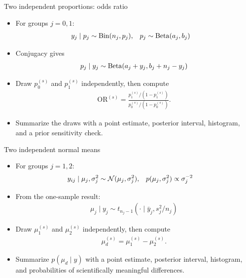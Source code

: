 \documentclass[10pt]{beamer}
\begin{document}
\begin{frame}{Two independent proportions: odds ratio}

  \begin{itemize}
  \item For groups $j=0,1$:
    \begin{align*}
      y_j \mid p_j &\sim \operatorname{Bin}(n_j,p_j), &
      p_j &\sim \operatorname{Beta}(a_j,b_j)
    \end{align*}
    \pause
  \item Conjugacy gives
    \begin{align*}
      p_j \mid y_j \sim \operatorname{Beta}(a_j+y_j,b_j+n_j-y_j)
    \end{align*}
    \pause
  \item Draw $p_0^{(s)}$ and $p_1^{(s)}$ independently, then compute
    \begin{align*}
      \mathrm{OR}^{(s)}
      =
      \frac{p_1^{(s)}/(1-p_1^{(s)})}
           {p_0^{(s)}/(1-p_0^{(s)})}.
    \end{align*}
    \pause
  \item Summarize the draws with a point estimate, posterior interval,
    histogram, and a prior sensitivity check.
  \end{itemize}

\end{frame}

\begin{frame}{Two independent normal means}

  \begin{itemize}
  \item For groups $j=1,2$:
    \begin{align*}
      y_{ij} \mid \mu_j,\sigma_j^2 &\sim \mathcal{N}(\mu_j,\sigma_j^2), &
      p(\mu_j,\sigma_j^2) &\propto \sigma_j^{-2}
    \end{align*}
    \pause
  \item From the one-sample result:
    \begin{align*}
      \mu_j \mid y_j \sim
      t_{n_j-1}(\cdot \mid \bar{y}_j,s_j^2/n_j)
    \end{align*}
    \pause
  \item Draw $\mu_1^{(s)}$ and $\mu_2^{(s)}$ independently, then compute
    \begin{align*}
      \mu_d^{(s)} = \mu_1^{(s)}-\mu_2^{(s)}.
    \end{align*}
    \pause
  \item Summarize $p(\mu_d \mid y)$ with a point estimate, posterior
    interval, histogram, and probabilities of scientifically meaningful
    differences.
  \end{itemize}

\end{frame}
\end{document}
